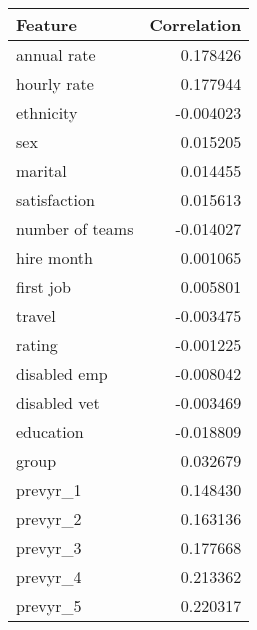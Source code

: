 \begin{tabular}{lr}
\toprule
Feature &         Correlation \\
\midrule
annual rate     &  0.178426 \\
hourly rate     &  0.177944 \\
ethnicity       & -0.004023 \\
sex             &  0.015205 \\
marital         &  0.014455 \\
satisfaction    &  0.015613 \\
number of teams & -0.014027 \\
hire month      &  0.001065 \\
first job       &  0.005801 \\
travel          & -0.003475 \\
rating          & -0.001225 \\
disabled emp    & -0.008042 \\
disabled vet    & -0.003469 \\
education       & -0.018809 \\
group           &  0.032679 \\
prevyr\_1        &  0.148430 \\
prevyr\_2        &  0.163136 \\
prevyr\_3        &  0.177668 \\
prevyr\_4        &  0.213362 \\
prevyr\_5        &  0.220317 \\
\bottomrule
\end{tabular}
